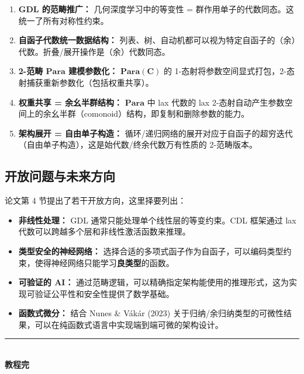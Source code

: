 \documentclass[12pt,a4paper]{ctexart}
\theoremstyle{definition}
\newcommand{\cat}[1]{\mathbf{#1}}
\newcommand{\Para}{\cat{Para}}
\begin{document}
\begin{enumerate}[nosep]
    \item \textbf{GDL 的范畴推广：} 几何深度学习中的等变性 = 群作用单子的代数同态。这统一了所有对称性约束。
    \item \textbf{自函子代数统一数据结构：} 列表、树、自动机都可以视为特定自函子的（余）代数。折叠/展开操作是（余）代数同态。
    \item \textbf{2-范畴 $\Para$ 建模参数化：} $\Para(\cat C)$ 的 1-态射将参数空间显式打包，2-态射捕获重新参数化（包括权重共享）。
    \item \textbf{权重共享 = 余幺半群结构：} $\Para$ 中 lax 代数的 lax 2-态射自动产生参数空间上的余幺半群（comonoid）结构，即复制和删除参数的能力。
    \item \textbf{架构展开 = 自由单子构造：} 循环/递归网络的展开对应于自函子的超穷迭代（自由单子构造），这是始代数/终余代数万有性质的 2-范畴版本。
\end{enumerate}

\subsection{开放问题与未来方向}

论文第 4 节提出了若干开放方向，这里择要列出：

\begin{itemize}[nosep]
    \item \textbf{非线性处理：} GDL 通常只能处理单个线性层的等变约束。CDL 框架通过 lax 代数可以跨越多个层和非线性激活函数来推理。
    \item \textbf{类型安全的神经网络：} 选择合适的多项式函子作为自函子，可以编码类型约束，使得神经网络只能学习\textbf{良类型}的函数。
    \item \textbf{可验证的 AI：} 通过范畴逻辑，可以精确指定架构能使用的推理形式，这为实现可验证公平性和安全性提供了数学基础。
    \item \textbf{函数式微分：} 结合 Nunes \& Vákár (2023) 关于归纳/余归纳类型的可微性结果，可以在纯函数式语言中实现端到端可微的架构设计。
\end{itemize}

\vspace{1em}
\begin{center}
\rule{0.5\textwidth}{0.5pt}\\[0.5em]
\textbf{教程完}
\end{center}
\end{document}
